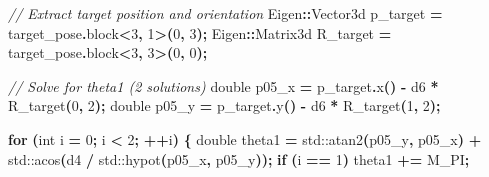 \documentclass[
]{article}
\newenvironment{Shaded}{\begin{snugshade}}{\end{snugshade}}
\newcommand{\BuiltInTok}[1]{#1}
\newcommand{\CommentTok}[1]{\textcolor[rgb]{0.56,0.35,0.01}{\textit{#1}}}
\newcommand{\ControlFlowTok}[1]{\textcolor[rgb]{0.13,0.29,0.53}{\textbf{#1}}}
\newcommand{\DataTypeTok}[1]{\textcolor[rgb]{0.13,0.29,0.53}{#1}}
\newcommand{\DecValTok}[1]{\textcolor[rgb]{0.00,0.00,0.81}{#1}}
\newcommand{\NormalTok}[1]{#1}
\newcommand{\OperatorTok}[1]{\textcolor[rgb]{0.81,0.36,0.00}{\textbf{#1}}}
\begin{document}
\begin{Shaded}
\begin{Highlighting}[]
        \CommentTok{// Extract target position and orientation}
\NormalTok{        Eigen}\OperatorTok{::}\NormalTok{Vector3d p\_target }\OperatorTok{=}\NormalTok{ target\_pose}\OperatorTok{.}\NormalTok{block}\OperatorTok{\textless{}}\DecValTok{3}\OperatorTok{,} \DecValTok{1}\OperatorTok{\textgreater{}(}\DecValTok{0}\OperatorTok{,} \DecValTok{3}\OperatorTok{);}
\NormalTok{        Eigen}\OperatorTok{::}\NormalTok{Matrix3d R\_target }\OperatorTok{=}\NormalTok{ target\_pose}\OperatorTok{.}\NormalTok{block}\OperatorTok{\textless{}}\DecValTok{3}\OperatorTok{,} \DecValTok{3}\OperatorTok{\textgreater{}(}\DecValTok{0}\OperatorTok{,} \DecValTok{0}\OperatorTok{);}

        \CommentTok{// Solve for theta1 (2 solutions)}
        \DataTypeTok{double}\NormalTok{ p05\_x }\OperatorTok{=}\NormalTok{ p\_target}\OperatorTok{.}\NormalTok{x}\OperatorTok{()} \OperatorTok{{-}}\NormalTok{ d6 }\OperatorTok{*}\NormalTok{ R\_target}\OperatorTok{(}\DecValTok{0}\OperatorTok{,} \DecValTok{2}\OperatorTok{);}
        \DataTypeTok{double}\NormalTok{ p05\_y }\OperatorTok{=}\NormalTok{ p\_target}\OperatorTok{.}\NormalTok{y}\OperatorTok{()} \OperatorTok{{-}}\NormalTok{ d6 }\OperatorTok{*}\NormalTok{ R\_target}\OperatorTok{(}\DecValTok{1}\OperatorTok{,} \DecValTok{2}\OperatorTok{);}

        \ControlFlowTok{for} \OperatorTok{(}\DataTypeTok{int}\NormalTok{ i }\OperatorTok{=} \DecValTok{0}\OperatorTok{;}\NormalTok{ i }\OperatorTok{\textless{}} \DecValTok{2}\OperatorTok{;} \OperatorTok{++}\NormalTok{i}\OperatorTok{)} \OperatorTok{\{}
            \DataTypeTok{double}\NormalTok{ theta1 }\OperatorTok{=} \BuiltInTok{std::}\NormalTok{atan2}\OperatorTok{(}\NormalTok{p05\_y}\OperatorTok{,}\NormalTok{ p05\_x}\OperatorTok{)} \OperatorTok{+} \BuiltInTok{std::}\NormalTok{acos}\OperatorTok{(}\NormalTok{d4 }\OperatorTok{/} \BuiltInTok{std::}\NormalTok{hypot}\OperatorTok{(}\NormalTok{p05\_x}\OperatorTok{,}\NormalTok{ p05\_y}\OperatorTok{));}
            \ControlFlowTok{if} \OperatorTok{(}\NormalTok{i }\OperatorTok{==} \DecValTok{1}\OperatorTok{)}\NormalTok{ theta1 }\OperatorTok{+=}\NormalTok{ M\_PI}\OperatorTok{;}


\end{Highlighting}
\end{Shaded}
\end{document}
